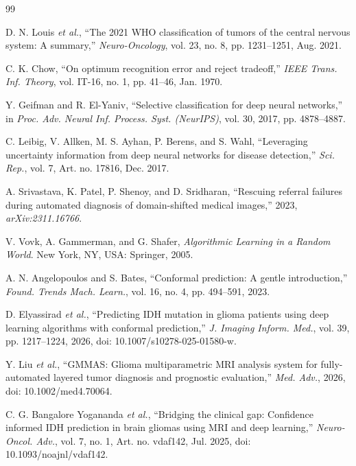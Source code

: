 \documentclass[conference]{IEEEtran}
\begin{document}
\begin{thebibliography}{99}

 D. N. Louis \emph{et al.}, ``The 2021 WHO classification of tumors of the central nervous system: A summary,'' \emph{Neuro-Oncology}, vol. 23, no. 8, pp. 1231--1251, Aug. 2021.

 C. K. Chow, ``On optimum recognition error and reject tradeoff,'' \emph{IEEE Trans. Inf. Theory}, vol. IT-16, no. 1, pp. 41--46, Jan. 1970.

 Y. Geifman and R. El-Yaniv, ``Selective classification for deep neural networks,'' in \emph{Proc. Adv. Neural Inf. Process. Syst. (NeurIPS)}, vol. 30, 2017, pp. 4878--4887.

 C. Leibig, V. Allken, M. S. Ayhan, P. Berens, and S. Wahl, ``Leveraging uncertainty information from deep neural networks for disease detection,'' \emph{Sci. Rep.}, vol. 7, Art. no. 17816, Dec. 2017.

 A. Srivastava, K. Patel, P. Shenoy, and D. Sridharan, ``Rescuing referral failures during automated diagnosis of domain-shifted medical images,'' 2023, \emph{arXiv:2311.16766}.

 V. Vovk, A. Gammerman, and G. Shafer, \emph{Algorithmic Learning in a Random World}. New York, NY, USA: Springer, 2005.

 A. N. Angelopoulos and S. Bates, ``Conformal prediction: A gentle introduction,'' \emph{Found. Trends Mach. Learn.}, vol. 16, no. 4, pp. 494--591, 2023.

 D. Elyassirad \emph{et al.}, ``Predicting IDH mutation in glioma patients using deep learning algorithms with conformal prediction,'' \emph{J. Imaging Inform. Med.}, vol. 39, pp. 1217--1224, 2026, doi: 10.1007/s10278-025-01580-w.

 Y. Liu \emph{et al.}, ``GMMAS: Glioma multiparametric MRI analysis system for fully-automated layered tumor diagnosis and prognostic evaluation,'' \emph{Med. Adv.}, 2026, doi: 10.1002/med4.70064.

 C. G. Bangalore Yogananda \emph{et al.}, ``Bridging the clinical gap: Confidence informed IDH prediction in brain gliomas using MRI and deep learning,'' \emph{Neuro-Oncol. Adv.}, vol. 7, no. 1, Art. no. vdaf142, Jul. 2025, doi: 10.1093/noajnl/vdaf142.


\end{thebibliography}
\end{document}

